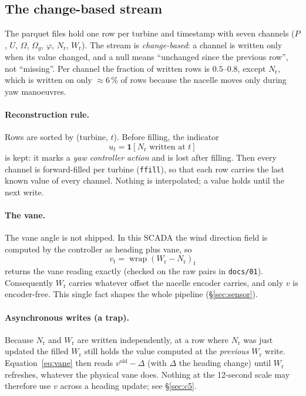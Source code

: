 \documentclass[11pt,a4paper]{article}
\theoremstyle{remark}
\newcommand{\wrap}{\operatorname{wrap}}
\newcommand{\code}[1]{\texttt{#1}}
\newcommand{\Wr}{W_{\mathrm{r}}}
\newcommand{\Nr}{N_{\mathrm{r}}}
\begin{document}
\subsection{The change-based stream}
The parquet files hold one row per turbine and timestamp with seven channels
($P$, $U$, $\Omega$, $\Omega_g$, $\varphi$, $\Nr$, $\Wr$). The stream is
\emph{change-based}: a channel is written only when its value changed, and a
null means ``unchanged since the previous row'', not ``missing''. Per channel
the fraction of written rows is $0.5$--$0.8$, except $\Nr$, which is written on
only $\approx6\,\%$ of rows because the nacelle moves only during yaw
manoeuvres.

\paragraph{Reconstruction rule.} Rows are sorted by (turbine, $t$). Before
filling, the indicator
\begin{equation}
  u_t = \mathbf 1[\Nr \text{ written at } t]
  \label{eq:nac_update}
\end{equation}
is kept: it marks a \emph{yaw controller action} and is lost after filling.
Then every channel is forward-filled per turbine (\code{ffill}), so that each
row carries the last known value of every channel. Nothing is interpolated;
a value holds until the next write.

\paragraph{The vane.} The vane angle is not shipped. In this SCADA the wind
direction field is computed by the controller as heading plus vane, so
\begin{equation}
  v_t = \wrap(\Wr - \Nr)_t
  \label{eq:vane}
\end{equation}
returns the vane reading exactly (checked on the raw pairs in \code{docs/01}).
Consequently $\Wr$ carries whatever offset the nacelle encoder carries, and only
$v$ is encoder-free. This single fact shapes the whole pipeline
(\S\ref{sec:sensor}).

\paragraph{Asynchronous writes (a trap).} Because $\Nr$ and $\Wr$ are written
independently, at a row where $\Nr$ was just updated the filled $\Wr$ still holds
the value computed at the \emph{previous} $\Wr$ write. Equation~\eqref{eq:vane}
then reads $v^{\mathrm{old}} - \Delta$ (with $\Delta$ the heading change) until
$\Wr$ refreshes, whatever the physical vane does. Nothing at the 12-second
scale may therefore use $v$ across a heading update; see \S\ref{sec:c5}.
\end{document}
